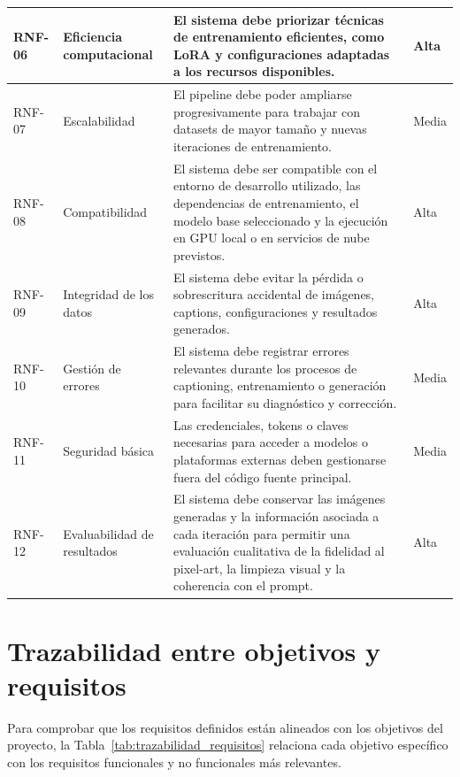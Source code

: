 \documentclass[a4paper,11pt,titlepage]{scrbook}
\begin{document}
\begin{longtable}{|C{1.1cm}|L{3.0cm}|L{7.0cm}|C{1.5cm}|}
RNF-06 &
Eficiencia computacional &
El sistema debe priorizar técnicas de entrenamiento eficientes, como LoRA y configuraciones adaptadas a los recursos disponibles. &
Alta \\
\hline

RNF-07 &
Escalabilidad &
El pipeline debe poder ampliarse progresivamente para trabajar con datasets de mayor tamaño y nuevas iteraciones de entrenamiento. &
Media \\
\hline

RNF-08 &
Compatibilidad &
El sistema debe ser compatible con el entorno de desarrollo utilizado, las dependencias de entrenamiento, el modelo base seleccionado y la ejecución en GPU local o en servicios de nube previstos. &
Alta \\
\hline

RNF-09 &
Integridad de los datos &
El sistema debe evitar la pérdida o sobrescritura accidental de imágenes, captions, configuraciones y resultados generados. &
Alta \\
\hline

RNF-10 &
Gestión de errores &
El sistema debe registrar errores relevantes durante los procesos de captioning, entrenamiento o generación para facilitar su diagnóstico y corrección. &
Media \\
\hline

RNF-11 &
Seguridad básica &
Las credenciales, tokens o claves necesarias para acceder a modelos o plataformas externas deben gestionarse fuera del código fuente principal. &
Media \\
\hline

RNF-12 &
Evaluabilidad de resultados &
El sistema debe conservar las imágenes generadas y la información asociada a cada iteración para permitir una evaluación cualitativa de la fidelidad al pixel-art, la limpieza visual y la coherencia con el prompt. &
Alta \\
\hline

\end{longtable}
\endgroup


\section{Trazabilidad entre objetivos y requisitos}

Para comprobar que los requisitos definidos están alineados con los objetivos del proyecto, la Tabla~\ref{tab:trazabilidad_requisitos} relaciona cada objetivo específico con los requisitos funcionales y no funcionales más relevantes.
\end{document}
